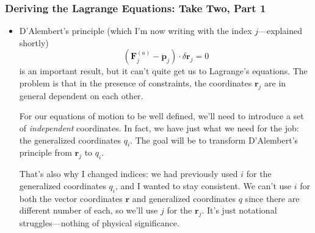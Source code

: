 \documentclass[11pt, a4paper]{article}
\newcommand{\bdot}[1]{\dot{\bm{#1}}} %
\begin{document}
\subsubsection{Deriving the Lagrange Equations: Take Two, Part 1}
\begin{itemize}
	\item D'Alembert's principle (which I'm now writing with the index $ j $---explained shortly)
	\begin{equation*}
		\left( \bm{F}_{j}^{(a)} - \bdot{p}_{j}\right) \cdot \delta \bm{r}_{j}= 0
	\end{equation*}
	is an important result, but it can't quite get us to Lagrange's equations. The problem is that in the presence of constraints, the coordinates $ \bm{r}_{j} $ are in general dependent on each other.
	
	For our equations of motion to be well defined, we'll need to introduce a set of \textit{independent} coordinates. In fact, we have just what we need for the job: the generalized coordinates $ q_{i} $. The goal will be to transform D'Alembert's principle from $ \bm{r}_{j} $ to $ q_{i} $.
	
	That's also why I changed indices: we had previously used $ i $ for the generalized coordinates $ q_{i} $, and I wanted to stay consistent. We can't use $ i $ for both the vector coordinates $ \bm{r} $ and generalized coordinates $ q $ since there are different number of each, so we'll use $ j $ for the $ \bm{r}_{j} $. It's just notational struggles---nothing of physical significance.
	

\end{itemize}
\end{document}
